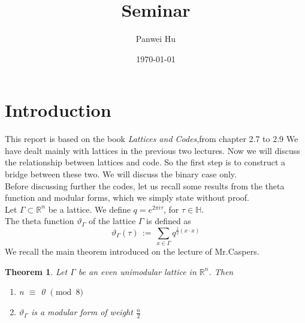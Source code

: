 \documentclass{article}
\title{Seminar}
\date{\today}
\author{Panwei Hu}
\newtheorem{theorem}{Theorem}[section]
\numberwithin{equation}{theorem}
\numberwithin{figure}{theorem}
\newcommand{\thetaFunction}[1]{\ensuremath{\vartheta_{#1}}}
\newcommand{\Real}{\ensuremath{\mathbb{R}}}
\newcommand{\imaginary}{\ensuremath{i}}
\newcommand{\HalfPlane}{\ensuremath{\mathbb{H}}}
\begin{document}
  \maketitle
  \newpage

\tableofcontents
	\newpage
  \newpage
\newpage
\section{Introduction}

This report is based on the book \emph{Lattices and Codes},from chapter 2.7 to 2.9
We have dealt mainly with lattices in the previous two lectures. Now we will discuss the relationship between lattices and code. So the first step is to construct a bridge between these two. We will discuss the binary case only.\\
Before discussing further the codes, let us recall some results from the theta function and modular forms, which we simply state without proof.\\
Let $\Gamma \subset \Real^n$ be a lattice. We define $q = e^{2\pi\imaginary\tau}$, for $\tau \in \HalfPlane$.\\
The theta function $\thetaFunction{\Gamma}$ of the lattice $\Gamma$ is defined as 
\[
	\thetaFunction{\Gamma}(\tau) \, := \,\sum_{x \in \Gamma} q^{\frac{1}{2}(x\cdot x)} 
\] 
We recall the main theorem introduced on the lecture of Mr.Caspers. 
\begin{theorem}\label{evenUniLattice}
Let $\Gamma$ be an even unimodular lattice in $\Real^n$. Then
\begin{enumerate}
	\item n $\equiv$ 0 $\pmod 8$
	\item {\thetaFunction{\Gamma}} is a modular form of weight $\frac{n}{2}$
\end{enumerate}
\end{theorem}
\end{document}
